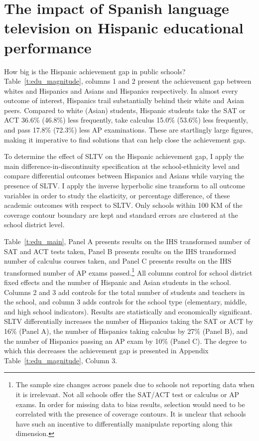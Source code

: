 \documentclass[11pt]{article}
\begin{document}


\section{The impact of Spanish language television on Hispanic educational performance}\label{s:school}

How big is the Hispanic achievement gap in public schools? Table~\ref{t:edu_magnitude}, columns 1 and 2 present the achievement gap between whites and Hispanics and Asians and Hispanics respectively. In almost every outcome of interest, Hispanics trail substantially behind their white and Asian peers. Compared to white (Asian) students, Hispanic students take the SAT or ACT 36.6\% (46.8\%) less frequently, take calculus 15.0\% (53.6\%) less frequently, and pass 17.8\% (72.3\%) less AP examinations. These are startlingly large figures, making it imperative to find solutions that can help close the achievement gap.

To determine the effect of SLTV on the Hispanic achievement gap, I apply the main difference-in-discontinuity specification at the school-ethnicity level and compare differential outcomes between Hispanics and Asians while varying the presence of SLTV. I apply the inverse hyperbolic sine transform to all outcome variables in order to study the elasticity, or percentage difference, of these academic outcomes with respect to SLTV. Only schools within 100 KM of the coverage contour boundary are kept and standard errors are clustered at the school district level. 
 
Table~\ref{t:edu_main}, Panel A presents results on the IHS transformed number of SAT and ACT tests taken, Panel B presents results on the IHS transformed number of calculus courses taken, and Panel C presents results on the IHS transformed number of AP exams passed.\footnote{ The sample size changes across panels due to schools not reporting data when it is irrelevant. Not all schools offer the SAT/ACT test or calculus or AP exams. In order for missing data to bias results, selection would need to be correlated with the presence of coverage contours. It is unclear that schools have such an incentive to differentially manipulate reporting along this dimension.} All columns control for school district fixed effects and the number of Hispanic and Asian students in the school. Columns 2 and 3 add controls for the total number of students and teachers in the school, and column 3 adds controls for the school type (elementary, middle, and high school indicators). Results are statistically and economically significant. SLTV differentially increases the number of Hispanics taking the SAT or ACT by 16\% (Panel A), the number of Hispanics taking calculus by 27\% (Panel B), and the number of Hispanics passing an AP exam by 10\% (Panel C). The degree to which this decreases the achievement gap is presented in Appendix Table~\ref{t:edu_magnitude}, Column 3. 
\end{document}
